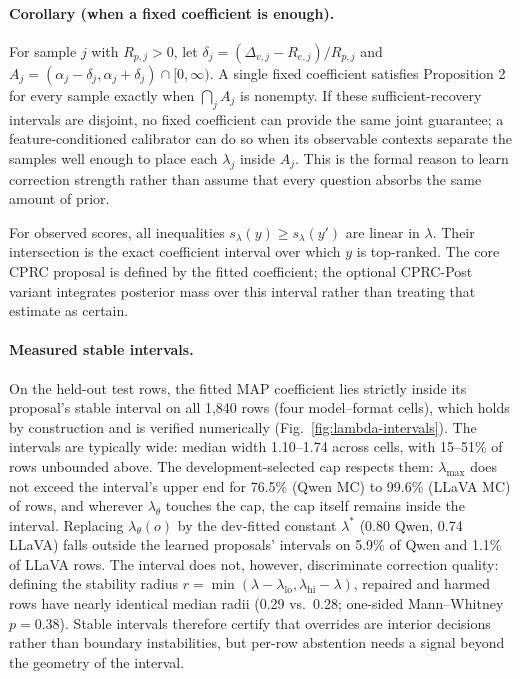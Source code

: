 \documentclass[letterpaper]{article}
\begin{document}
\paragraph{Corollary (when a fixed coefficient is enough).}
For sample $j$ with $R_{p,j}>0$, let
$\delta_j=(\Delta_{v,j}-R_{e,j})/R_{p,j}$ and
$A_j=(\alpha_j-\delta_j,\alpha_j+\delta_j)\cap[0,\infty)$. A single fixed
coefficient satisfies Proposition 2 for every sample exactly when
$\bigcap_j A_j$ is nonempty. If these sufficient-recovery intervals are
disjoint, no fixed coefficient can provide the same joint guarantee; a
feature-conditioned calibrator can do so when its observable contexts separate
the samples well enough to place each $\lambda_j$ inside $A_j$. This is the
formal reason to learn correction strength rather than assume that every
question absorbs the same amount of prior.

For observed scores, all inequalities
$s_\lambda(y)\ge s_\lambda(y')$ are linear in $\lambda$. Their intersection is
the exact coefficient interval over which $y$ is top-ranked. The core CPRC
proposal is defined by the fitted coefficient; the optional CPRC-Post variant
integrates posterior mass over this interval rather than treating that estimate
as certain.

\paragraph{Measured stable intervals.}
On the held-out test rows, the fitted MAP coefficient lies strictly inside its
proposal's stable interval on all 1{,}840 rows (four model--format cells),
which holds by construction and is verified numerically
(Fig.~\ref{fig:lambda-intervals}). The intervals are typically wide: median
width 1.10--1.74 across cells, with 15--51\% of rows unbounded above. The
development-selected cap respects them: $\lambda_{\max}$ does not exceed the
interval's upper end for 76.5\% (Qwen MC) to 99.6\% (LLaVA MC) of rows, and
wherever $\lambda_\theta$ touches the cap, the cap itself remains inside the
interval. Replacing $\lambda_\theta(o)$ by the dev-fitted constant $\lambda^*$
(0.80 Qwen, 0.74 LLaVA) falls outside the learned proposals' intervals on
5.9\% of Qwen and 1.1\% of LLaVA rows. The interval does not, however,
discriminate correction quality: defining the stability radius
$r=\min(\lambda-\lambda_{\mathrm{lo}},\lambda_{\mathrm{hi}}-\lambda)$, repaired
and harmed rows have nearly identical median radii (0.29 vs.\ 0.28; one-sided
Mann--Whitney $p=0.38$). Stable intervals therefore certify that overrides are
interior decisions rather than boundary instabilities, but per-row abstention
needs a signal beyond the geometry of the interval.
\end{document}
